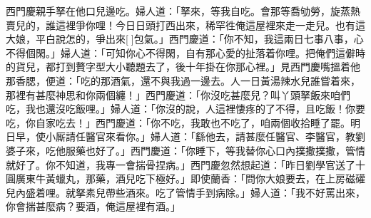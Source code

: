 西門慶親手拏在他口兒邊吃。婦人道：「拏來，等我自吃。會那等喬劬勞，旋蒸熱賣兒的，{}誰這裡爭你哩！{}{}今日日頭打西出來，稀罕徃俺這屋裡來走一走兒。也有這大娘，平白說怎的，爭出來[]包氣。」西門慶道：「你不知，我這兩日七事八事，心不得個閑。」{}婦人道：「可知你心不得閑，自有那心愛的扯落着你哩。把俺們這僻時的貨兒，都打到贅字型大小聽題去了，後十年掛在你那心裡。」{}見西門慶嘴搵着他那香腮，便道：「吃的那酒氣，還不與我過一邊去。人一日黃湯辣水兒誰嘗着來，那裡有甚麼神思和你兩個纏！」西門慶道：「你沒吃甚麼兒？叫丫頭拏飯來咱們吃，我也還沒吃飯哩。」婦人道：「你沒的說，人這裡悽疼的了不得，且吃飯！你要吃，你自家吃去！」西門慶道：「你不吃，我敢也不吃了，咱兩個收拾睡了罷。明日早，使小厮請任醫官來看你。」婦人道：「繇他去，請甚麼任醫官、李醫官，教劉婆子來，吃他服藥也好了。」西門慶道：「你睡下，等我替你心口內撲撒撲撒，管情就好了。你不知道，我專一會揣骨捏病。」{}西門慶忽然想起道：「昨日劉學官送了十圓廣東牛黃蠟丸，那藥，酒兒吃下極好。」即使蘭香：「問你大娘要去，在上房磁礶兒內盛着哩。就拏素兒帶些酒來。吃了管情手到病除。」婦人道：「我不好罵出來，你會揣甚麼病？要酒，俺這屋裡有酒。」

